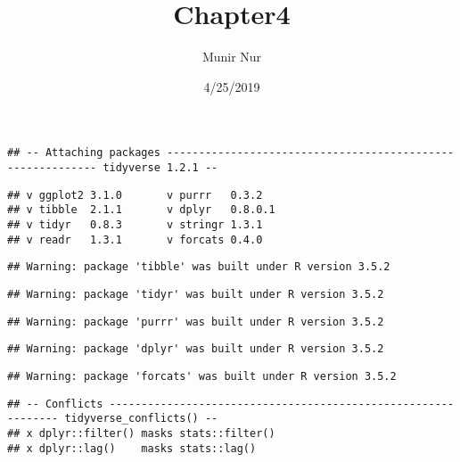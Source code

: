 \documentclass[]{article}
\title{Chapter4}
\author{Munir Nur}
\date{4/25/2019}
\newenvironment{Shaded}{\begin{snugshade}}{\end{snugshade}}
\newcommand{\DataTypeTok}[1]{\textcolor[rgb]{0.13,0.29,0.53}{#1}}
\newcommand{\KeywordTok}[1]{\textcolor[rgb]{0.13,0.29,0.53}{\textbf{#1}}}
\newcommand{\NormalTok}[1]{#1}
\newcommand{\OperatorTok}[1]{\textcolor[rgb]{0.81,0.36,0.00}{\textbf{#1}}}
\newcommand{\OtherTok}[1]{\textcolor[rgb]{0.56,0.35,0.01}{#1}}
\begin{document}
\maketitle

\begin{Shaded}
\end{Shaded}

\begin{verbatim}
## -- Attaching packages ----------------------------------------------------------- tidyverse 1.2.1 --
\end{verbatim}

\begin{verbatim}
## v ggplot2 3.1.0       v purrr   0.3.2  
## v tibble  2.1.1       v dplyr   0.8.0.1
## v tidyr   0.8.3       v stringr 1.3.1  
## v readr   1.3.1       v forcats 0.4.0
\end{verbatim}

\begin{verbatim}
## Warning: package 'tibble' was built under R version 3.5.2
\end{verbatim}

\begin{verbatim}
## Warning: package 'tidyr' was built under R version 3.5.2
\end{verbatim}

\begin{verbatim}
## Warning: package 'purrr' was built under R version 3.5.2
\end{verbatim}

\begin{verbatim}
## Warning: package 'dplyr' was built under R version 3.5.2
\end{verbatim}

\begin{verbatim}
## Warning: package 'forcats' was built under R version 3.5.2
\end{verbatim}

\begin{verbatim}
## -- Conflicts -------------------------------------------------------------- tidyverse_conflicts() --
## x dplyr::filter() masks stats::filter()
## x dplyr::lag()    masks stats::lag()
\end{verbatim}
\end{document}
